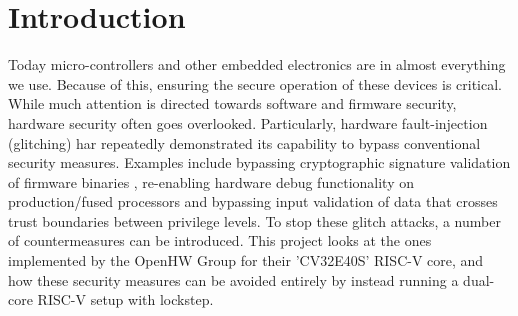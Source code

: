 \chapter{Introduction}
\label{intro} 

Today micro-controllers and other embedded electronics are in almost everything we use. Because of this, ensuring the secure operation of these devices is critical. While much attention is directed towards software and firmware security, hardware security often goes overlooked. Particularly, hardware fault-injection (glitching) har repeatedly demonstrated its capability to bypass conventional security measures. Examples include bypassing cryptographic signature validation of firmware binaries \cite{hole_in_soc}, re-enabling hardware debug functionality on production/fused processors\cite{reenable_debug} and bypassing input validation of data that crosses trust boundaries between privilege levels\cite{qualcom}. To stop these glitch attacks, a number of countermeasures can be introduced. This project looks at the ones implemented by the OpenHW Group for their 'CV32E40S' RISC-V core\cite{cv32e40s_manual}, and how these security measures can be avoided entirely by instead running a dual-core RISC-V setup with lockstep. 

